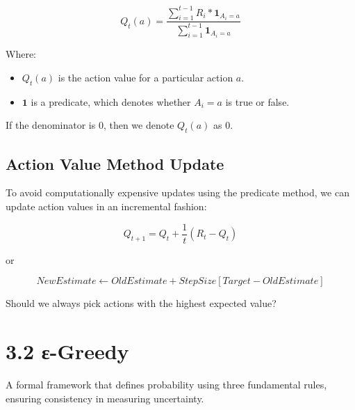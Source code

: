 \documentclass[
  letterpaper,
  DIV=11,
  numbers=noendperiod]{scrreprt}
\providecommand{\tightlist}{%
  \setlength{\itemsep}{0pt}\setlength{\parskip}{0pt}}\usepackage{longtable,booktabs,array}
\begin{document}
\[
Q_t(a) = \frac{\sum_{i=1}^{t-1} R_i * \mathbf{1}_{A_i = a}}{\sum_{i=1}^{t-1} \mathbf{1}_{A_i = a}}
\]

Where:

\begin{itemize}
\tightlist
\item
  \(Q_t(a)\) is the action value for a particular action \(a\).
\item
  \(\mathbf{1}\) is a predicate, which denotes whether \(A_i = a\) is
  true or false.
\end{itemize}

If the denominator is \(0\), then we denote \(Q_t(a)\) as \(0\).

\section{Action Value Method Update}\label{action-value-method-update}

To avoid computationally expensive updates using the predicate method,
we can update action values in an incremental fashion:

\[
Q_{t+1} = Q_t + \frac{1}{t} (R_t - Q_t)
\]

or

\[
NewEstimate \gets OldEstimate + StepSize [Target - OldEstimate]
\]

\begin{tcolorbox}[enhanced jigsaw, colback=white, left=2mm, breakable, opacityback=0, bottomrule=.15mm, rightrule=.15mm, arc=.35mm, colframe=quarto-callout-note-color-frame, leftrule=.75mm, toprule=.15mm]

Should we always pick actions with the highest expected value? 🤔

\end{tcolorbox}

\chapter{3.2 ε-Greedy}\label{ux3b5-greedy}

\begin{tcolorbox}[enhanced jigsaw, colback=white, left=2mm, breakable, opacityback=0, bottomrule=.15mm, rightrule=.15mm, arc=.35mm, colframe=quarto-callout-note-color-frame, leftrule=.75mm, toprule=.15mm]

A formal framework that defines probability using three fundamental
rules, ensuring consistency in measuring uncertainty. 🎲

\end{tcolorbox}
\end{document}
